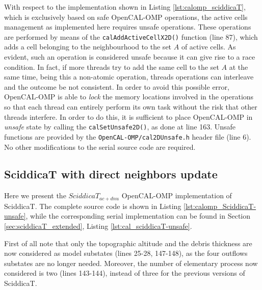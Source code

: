 

With respect to the implementation shown in Listing
\ref{lst:calomp_sciddicaT}, which is exclusively based on safe
OpenCAL-OMP operations, the active cells management as implemented
here requires unsafe operations. These operations are performed by
means of the \verb'calAddActiveCellX2D()' function (line 87), which
adds a cell belonging to the neighbourhood to the set $A$ of active
cells. As evident, such an operation is considered unsafe because it
can give rise to a race condition. In fact, if more threads try to add
the same cell to the set $A$ at the same time, being this a non-atomic
operation, threads operations can interleave and the outcome be not
consistent. In order to avoid this possible error, OpenCAL-OMP is able
to \emph{lock} the memory locations involved in the operations so that
each thread can entirely perform its own task without the risk that
other threads interfere. In order to do this, it is sufficient to
place OpenCAL-OMP in \emph{unsafe} state by calling the
\verb'calSetUnsafe2D()', as done at line 163. Unsafe functions are
provided by the \verb'OpenCAL-OMP/cal2DUnsafe.h' header file (line
6). No other modifications to the serial source code are required.

\subsection{SciddicaT with direct neighbors update}
Here we present the $SciddicaT_{ac+dnu}$ OpenCAL-OMP implementation of
SciddicaT. The complete source code is shown in Listing
\ref{lst:calomp_SciddicaT-unsafe}, while the corresponding serial
implementation can be found in Section \ref{sec:sciddicaT_extended},
Listing \ref{lst:cal_sciddicaT-unsafe}.



First of all note that only the topographic altitude and the debris
thickness are now considered as model substates (lines 25-28,
147-148), as the four outflows substates are no longer
needed. Moreover, the number of elementary process now considered is
two (lines 143-144), instead of three for the previous versions of
SciddicaT.

